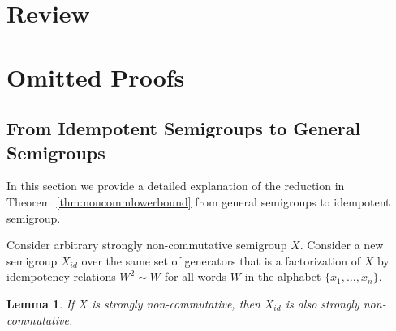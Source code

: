 \documentclass[11pt,letterpaper]{article}
\newtheorem{lemma}{Lemma}
\begin{document}
\section{Review}





\section{Omitted Proofs}


\subsection{From Idempotent Semigroups to General Semigroups}\label{sec:noncommutative_extension}

In this section we provide a detailed explanation of the reduction in Theorem~\ref{thm:noncommlowerbound} from general semigroups to idempotent semigroup.

Consider arbitrary strongly non-commutative semigroup $X$. Consider a new semigroup $X_{id}$ over the same set of generators that is a factorization of $X$ by idempotency relations $W^2\sim W$ for all words $W$ in the alphabet $\{x_1,\ldots, x_n\}$.

\begin{lemma} \label{lem:idempotisation}
If $X$ is strongly non-commutative, then $X_{id}$ is also strongly non-commutative.
\end{lemma}
\end{document}
